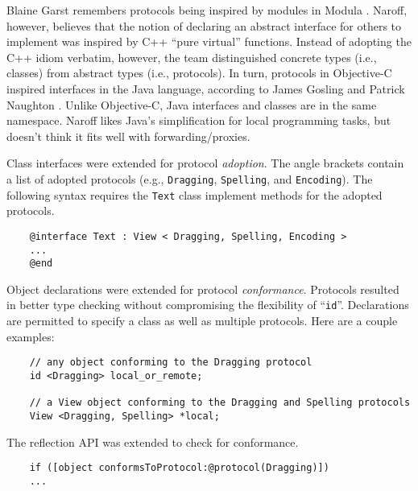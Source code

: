 \documentclass[acmsmall]{acmart}\settopmatter{}
\begin{document}
Blaine Garst remembers protocols being inspired by modules in Modula \citep[22--25, 54]{garst_oral_2016}. Naroff, however, believes that the notion of declaring an abstract interface for others to implement was inspired by C++ ``pure virtual'' functions. Instead of adopting the C++ idiom verbatim, however, the team distinguished concrete types (i.e., classes) from abstract types (i.e., protocols). In turn, protocols in Objective-C inspired interfaces in the Java language, according to James Gosling \citep[13--14]{gosling_oral_2019} and Patrick Naughton . Unlike Objective-C, Java interfaces and classes are in the same namespace. Naroff likes Java's simplification for local programming tasks, but doesn't think it fits well with forwarding/proxies. 

Class interfaces were extended for protocol \emph{adoption}. The angle brackets contain a list of adopted protocols (e.g., \verb$Dragging$, \verb$Spelling$, and \verb$Encoding$). The following syntax requires the \verb$Text$ class implement methods for the adopted protocols. 
\begin{verbatim}
    @interface Text : View < Dragging, Spelling, Encoding >
    ...
    @end
\end{verbatim}
Object declarations were extended for protocol \emph{conformance}. Protocols resulted in better type checking without compromising the flexibility of ``\verb$id$''. Declarations are permitted to specify a class as well as multiple protocols. Here are a couple examples:
\begin{verbatim}
    // any object conforming to the Dragging protocol
    id <Dragging> local_or_remote; 

    // a View object conforming to the Dragging and Spelling protocols
    View <Dragging, Spelling> *local; 
\end{verbatim}
The reflection API was extended to check for conformance.
\begin{verbatim}
    if ([object conformsToProtocol:@protocol(Dragging)])
    ...
\end{verbatim}
\end{document}
